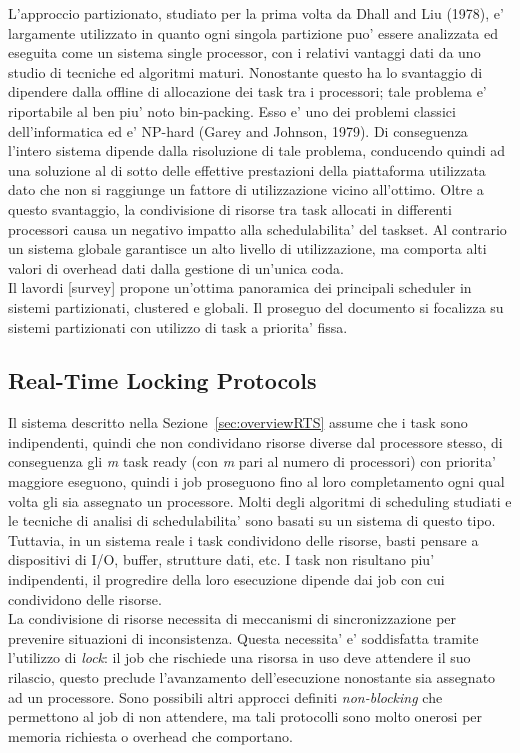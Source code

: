 L'approccio partizionato, studiato per la prima volta da Dhall and Liu (1978), e' largamente utilizzato in quanto ogni singola partizione puo' essere analizzata ed eseguita come un sistema single processor, con i relativi vantaggi dati da uno studio di tecniche ed algoritmi maturi. Nonostante questo ha lo svantaggio di dipendere dalla offline di allocazione dei task tra i processori; tale problema e' riportabile al ben piu' noto bin-packing. Esso e' uno dei problemi classici dell'informatica ed e' NP-hard (Garey and Johnson, 1979). Di conseguenza l'intero sistema dipende dalla risoluzione di tale problema, conducendo quindi ad una soluzione al di sotto delle effettive prestazioni della piattaforma utilizzata dato che non si raggiunge un fattore di utilizzazione vicino all'ottimo. Oltre a questo svantaggio, la condivisione di risorse tra task allocati in differenti processori causa un negativo impatto alla schedulabilita' del taskset. Al contrario un sistema globale garantisce un alto livello di utilizzazione, ma comporta alti valori di overhead dati dalla gestione di un'unica coda.\\

Il lavordi [survey] propone un'ottima panoramica dei principali scheduler in sistemi partizionati, clustered e globali. Il proseguo del documento si focalizza su sistemi partizionati con utilizzo di task a priorita' fissa.

\subsection{Real-Time Locking Protocols}
\label{sec:lockProtocols}

Il sistema descritto nella Sezione~\ref{sec:overviewRTS} assume che i task sono indipendenti, quindi che non condividano risorse diverse dal processore stesso, di conseguenza gli \textit{m} task ready (con \textit{m} pari al numero di processori) con priorita' maggiore eseguono, quindi i job proseguono fino al loro completamento ogni qual volta gli sia assegnato un processore. Molti degli algoritmi di scheduling studiati e le tecniche di analisi di schedulabilita' sono basati su un sistema di questo tipo. Tuttavia, in un sistema reale i task condividono delle risorse, basti pensare a dispositivi di I/O, buffer, strutture dati, etc. I task non risultano piu' indipendenti, il progredire della loro esecuzione dipende dai job con cui condividono delle risorse.\\

La condivisione di risorse necessita di meccanismi di sincronizzazione per prevenire situazioni di inconsistenza. Questa necessita' e' soddisfatta tramite l'utilizzo di \textit{lock}: il job che rischiede una risorsa in uso deve attendere il suo rilascio, questo preclude l'avanzamento dell'esecuzione nonostante sia assegnato ad un processore. Sono possibili altri approcci definiti \textit{non-blocking} che permettono al job di non attendere, ma tali protocolli sono molto onerosi per memoria richiesta o overhead che comportano.\\

